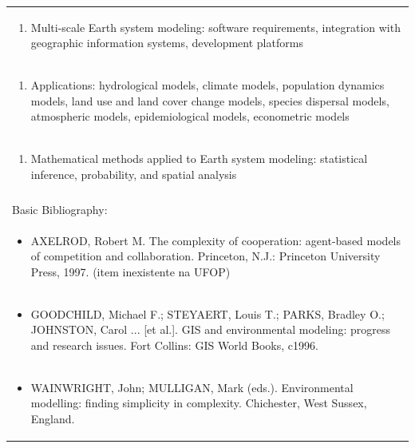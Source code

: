 \documentclass[11pt]{article}
\begin{document}
\begin{center}
\begin{longtable}{|p{4cm}|p{4cm}|p{4cm}|p{4cm}|}
\multicolumn{4}{|p{\dimexpr 16cm + 6\tabcolsep\relax}|}{\begin{enumerate}[start=8]\item Multi-scale Earth system modeling: software requirements, integration with geographic information systems, development platforms\end{enumerate}}\\
\multicolumn{4}{|p{\dimexpr 16cm + 6\tabcolsep\relax}|}{\begin{enumerate}[start=9]\item Applications: hydrological models, climate models, population dynamics models, land use and land cover change models, species dispersal models, atmospheric models, epidemiological models, econometric models\end{enumerate}}\\
\multicolumn{4}{|p{\dimexpr 16cm + 6\tabcolsep\relax}|}{\begin{enumerate}[start=10]\item Mathematical methods applied to Earth system modeling: statistical inference, probability, and spatial analysis\end{enumerate}}\\
\multicolumn{4}{|p{\dimexpr 16cm + 6\tabcolsep\relax}|}{}\\
\hline
\multicolumn{4}{|p{16cm}|}{Basic Bibliography:}\\*
\multicolumn{4}{|p{\dimexpr 16cm + 6\tabcolsep\relax}|}{\begin{itemize}\item AXELROD, Robert M. The complexity of cooperation: agent-based models of competition and collaboration. Princeton, N.J.: Princeton University Press, 1997. (item inexistente na UFOP)\end{itemize}}\\
\multicolumn{4}{|p{\dimexpr 16cm + 6\tabcolsep\relax}|}{\begin{itemize}\item GOODCHILD, Michael F.; STEYAERT, Louis T.; PARKS, Bradley O.; JOHNSTON, Carol ... [et al.]. GIS and environmental modeling: progress and research issues. Fort Collins: GIS World Books, c1996.\end{itemize}}\\
\multicolumn{4}{|p{\dimexpr 16cm + 6\tabcolsep\relax}|}{\begin{itemize}\item WAINWRIGHT, John; MULLIGAN, Mark (eds.). Environmental modelling: finding simplicity in complexity. Chichester, West Sussex, England.\end{itemize}}\\

\end{longtable}
\end{center}
\end{document}

